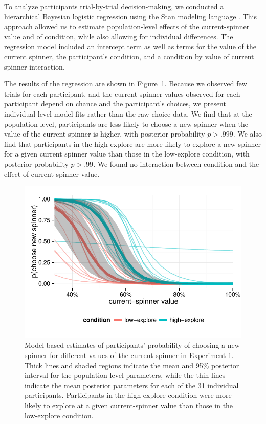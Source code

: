 \documentclass[10pt,letterpaper]{article}
\begin{document}
To analyze participants trial-by-trial decision-making, we conducted a hierarchical
Bayesian logistic regression using the Stan modeling language \citep{stan-software:2015}.
This approach allowed us to estimate population-level effects of the
current-spinner value and of condition, while also allowing for individual
differences. The regression model included an intercept term as well as terms
for the value of the current spinner, the participant's condition, and a
condition by value of current spinner interaction.

The results of the regression are shown in Figure~\ref{fig:exp1results}.
Because we observed few trials for each participant, and the current-spinner
values observed for each participant depend on chance and the participant's
choices, we present individual-level model fits rather than the raw choice data.
We find that at the population level, participants are less likely to choose a
new spinner when the value of the current spinner is higher, with posterior
probability $p>.999$. We also find that participants in the high-explore are more likely to explore a new spinner for a
given current spinner value than those in the low-explore condition, with
posterior probability $p>.99$. We found no interaction between condition and the
effect of current-spinner value.

\begin{figure}
\centering
\includegraphics[width=\columnwidth]{figures/exp1results.pdf}
\caption{Model-based estimates of participants' probability of choosing a new
  spinner for different values of the current spinner in Experiment 1. Thick
  lines and shaded regions indicate the mean and 95\% posterior interval for the
  population-level parameters, while the thin lines indicate the mean posterior
  parameters for each of the 31 individual participants. Participants in the
  high-explore condition were more
  likely to explore at a given current-spinner value than those in the
  low-explore condition.}
\label{fig:exp1results}
\end{figure}
\end{document}
